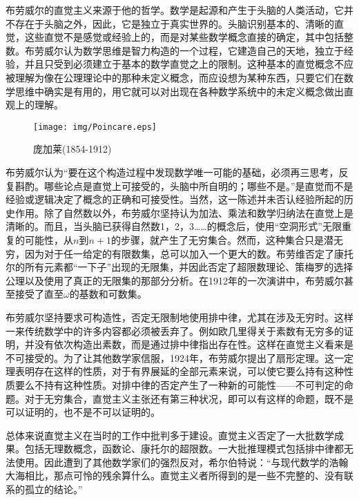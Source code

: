 \documentclass{article}
\begin{document}
布劳威尔的直觉主义来源于他的哲学。数学是起源和产生于头脑的人类活动，它并不存在于头脑之外，因此，它是独立于真实世界的。头脑识别基本的、清晰的直觉，这些直觉不是感觉或经验上的，而是对某些数学概念直接的确定，其中包括整数。布劳威尔认为数学思维是智力构造的一个过程，它建造自己的天地，独立于经验，并且只受到必须建立于基本的数学直觉之上的限制。这种基本的直觉概念不应被理解为像在公理理论中的那种未定义概念，而应设想为某种东西，只要它们在数学思维中确实是有用的，用它就可以对出现在各种数学系统中的未定义概念做出直观上的理解。

\begin{wrapfigure}{R}{0.3\textwidth}
 \centering
 \texttt{[image: img/Poincare.eps]}
 \captionsetup{labelformat=empty}
 \caption{庞加莱(1854-1912)}
 \label{fig:Poincare}
\end{wrapfigure}

布劳威尔认为“要在这个构造过程中发现数学唯一可能的基础，必须再三思考，反复斟酌。哪些论点是直觉上可接受的，头脑中所自明的；哪些不是。”是直觉而不是经验或逻辑决定了概念的正确和可接受性。当然，这一陈述并未否认经验所起的历史作用。除了自然数以外，布劳威尔坚持认为加法、乘法和数学归纳法在直觉上是清晰的。而且，当头脑已获得自然数1，2，3……的概念后，使用“空洞形式”无限重复的可能性，从$n$到$n+1$的步骤，就产生了无穷集合。然而，这种集合只是潜无穷，因为对于任一给定的有限数集，总可以加入一个更大的数。布劳维否定了康托尔的所有元素都“一下子”出现的无限集，并因此否定了超限数理论、策梅罗的选择公理以及使用了真正的无限集的那部分分析。在1912年的一次演讲中，布劳威尔甚至接受了直至$\omega$的基数和可数集。

布劳威尔坚持要求可构造性，否定无限制地使用排中律，尤其在涉及无穷时。这样一来传统数学中的许多内容都必须被丢弃了。例如欧几里得关于素数有无穷多的证明，并没有依次构造出素数，而是通过排中律指出存在性。这样在直觉主义看来是不可接受的。为了让其他数学家信服，1924年，布劳威尔提出了扇形定理。这一定理表明存在这样的性质，对于有界展延的全部元素来说，可以使它要么持有这种性质要么不持有这种性质。对排中律的否定产生了一种新的可能性——不可判定的命题。对于无穷集合，直觉主义主张还有第三种状况，即可以有这样的命题，既不是可以证明的，也不是不可以证明的。

总体来说直觉主义在当时的工作中批判多于建设。直觉主义否定了一大批数学成果。包括无理数概念，函数论、康托尔的超限数。一大批推理模式包括排中律都无法使用。因此遭到了其他数学家们的强烈反对，希尔伯特说：“与现代数学的浩翰大海相比，那点可怜的残余算什么。直觉主义者所得到的是一些不完整的、没有联系的孤立的结论。”

\end{document}
